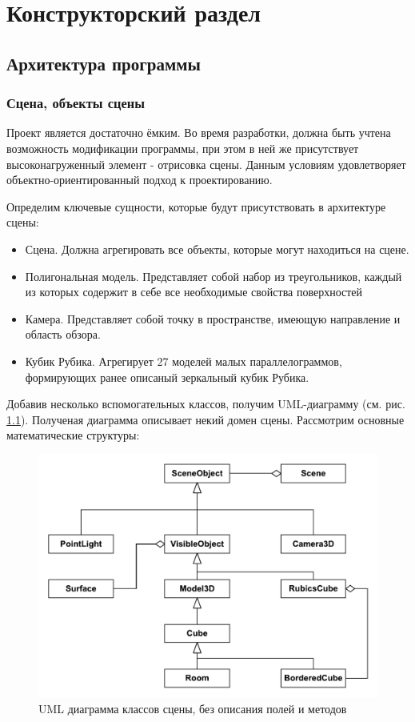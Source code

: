 \documentclass[a4paper, 14pt]{report}
\begin{document}
	\chapter{Конструкторский раздел}
	\section{Архитектура программы}
	\subsection{Сцена, объекты сцены}
	Проект является достаточно ёмким. Во время разработки, должна быть учтена возможность модификации программы, при этом в ней же присутствует высоконагруженный элемент - отрисовка сцены. Данным условиям удовлетворяет объектно-ориентированный подход к проектированию.
	
	Определим ключевые сущности, которые будут присутствовать в архитектуре сцены:
	\begin{itemize}
		\item Сцена. Должна агрегировать все объекты, которые могут находиться на сцене.
		\item Полигональная модель. Представляет собой набор из треугольников, каждый из которых содержит в себе все необходимые свойства поверхностей
		\item Камера. Представляет собой точку в пространстве, имеющую направление и область обзора.
		\item Кубик Рубика. Агрегирует 27 моделей малых параллелограммов, формирующих ранее описаный зеркальный кубик Рубика.
	\end{itemize}

	Добавив несколько вспомогательных классов, получим UML-диаграмму (см. рис. \ref{fig:uml_scene}). Полученая диаграмма описывает некий домен сцены. Рассмотрим основные математические структуры:
	\begin{figure}[ht]
		\centering
		\includegraphics[width=1\linewidth]{uml_scene}
		\caption{UML диаграмма классов сцены, без описания полей и методов}
		\label{fig:uml_scene}
	\end{figure}
	
\end{document}
